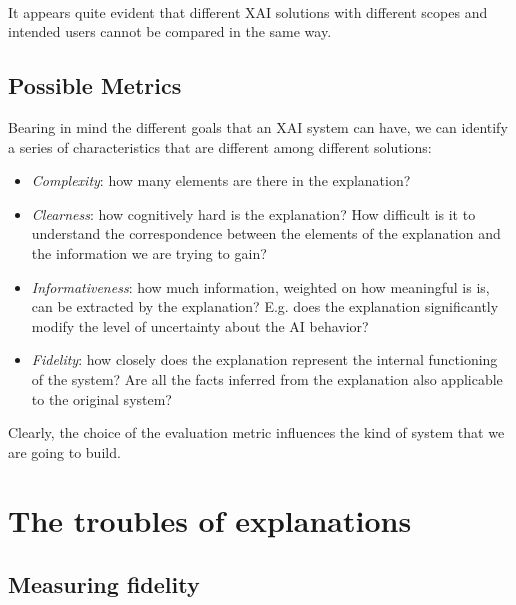 \documentclass[conference]{IEEEtran}
\begin{document}
\

It appears quite evident that different XAI solutions with different scopes and
intended users cannot be compared in the same way.


\subsection{Possible Metrics}
\label{sec:dimensions}

Bearing in mind the different goals that an XAI system can have, we can identify
a series of characteristics that are different among different solutions:

\begin{itemize}
    \item \textit{Complexity}: how many elements are there in the explanation?
    \item \textit{Clearness}: how cognitively hard is the explanation? How
          difficult is it to understand the correspondence between the elements
          of the explanation and the information we are trying to gain?
    \item \textit{Informativeness}: how much information, weighted on how
          meaningful is is, can be extracted by the explanation? E.g. does the
          explanation significantly modify the level of uncertainty about the AI
          behavior?
    \item \textit{Fidelity}: how closely does the explanation represent the
          internal functioning of the system? Are all the facts inferred from
          the explanation also applicable to the original system?
\end{itemize}

Clearly, the choice of the evaluation metric influences the kind of system that we are going to build.

\section{The troubles of explanations}
\label{sec:troubles}

\subsection{Measuring fidelity}
\label{sec:fidelity}
\end{document}
